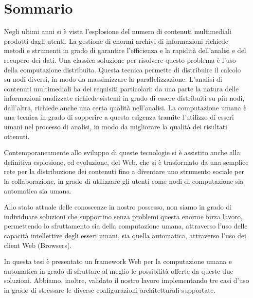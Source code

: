 \cleardoublepage
{}
{}
\begingroup
\let\clearpage\relax
\let\cleardoublepage\relax
\let\cleardoublepage\relax

\chapter*{Sommario}

Negli ultimi anni si è vista l'esplosione del numero di contenuti multimediali
prodotti dagli utenti. La gestione di enormi archivi di informazioni richiede
metodi e strumenti in grado di garantire l'efficienza e la rapidità dell'analisi e
del recupero dei dati. Una classica soluzione per risolvere questo problema è
l'uso della computazione distribuita. Questa tecnica permette di distribuire
il calcolo su nodi diversi, in modo da massimizzare la parallelizzazione.
L'analisi di contenuti multimediali ha dei requisiti particolari: da una parte
la natura delle informazioni analizzate richiede sistemi in grado di essere
distribuiti su più nodi, dall'altra, richiede anche una certa qualità nell'analisi. 
La computazione umana è una tecnica in grado di sopperire a questa esigenza tramite 
l'utilizzo di esseri umani nel processo di analisi, in modo da migliorare la qualità
dei risultati ottenuti.

Contemporaneamente allo sviluppo di queste tecnologie si è assistito anche alla
definitiva esplosione, ed evoluzione, del Web, che si è trasformato da una semplice
rete per la distribuzione dei contenuti fino a diventare uno strumento sociale per
la collaborazione, in grado di utilizzare gli utenti come nodi di computazione sia
automatica sia umana.


Allo stato attuale delle conoscenze in nostro possesso, non siamo in grado di
individuare soluzioni che supportino senza problemi questa enorme forza lavoro, permettendo lo
sfruttamento sia della computazione umana, attraverso l'uso delle capacità
intellettive degli esseri umani, sia quella automatica, attraverso l'uso dei
client Web (Browsers).

In questa tesi è presentato un framework Web per la computazione umana e
automatica in grado di sfruttare al meglio le possibilità offerte da queste due
soluzioni. Abbiamo, inoltre, validato il nostro lavoro implementando tre casi
d'uso in grado di stressare le diverse configurazioni architetturali supportate.

